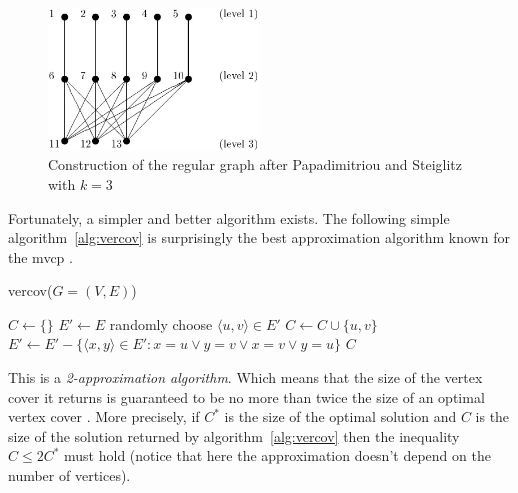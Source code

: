 \documentclass[12pt]{article}
\begin{document}
\begin{figure}[!htb]
\centering
\includegraphics[width=0.5\textwidth]{ps}
\caption[The regular graph after Papadimitriou
and Steiglitz for $k=3$]
{Construction of the regular graph after Papadimitriou
and Steiglitz with $k=3$}
\label{fig:ps}
\end{figure}

Fortunately, a simpler and better algorithm exists.
The following simple algorithm~\ref{alg:vercov} is surprisingly the
best approximation algorithm known for the mvcp \cite[p.~301]{9:mvcp}.

\begin{algorithm}[!htb]
\caption{vercov($G = (V, E)$)}
\label{alg:vercov}
\begin{algorithmic}[1]

\State $C \gets \{ \}$
\State $E' \gets E$
\State randomly choose $ \langle u, v \rangle \in E'$
\label{alg:rand}
\State $C \gets C \cup \{u, v\}$
\State $E' \gets E' -
\{ \langle x, y \rangle \in E' : x=u \vee y=v \vee x=v \vee y=u \}$
\State {}
\EndWhile
\State \Return $C$

\end{algorithmic}
\end{algorithm}

This is a \textit{2-approximation algorithm}. Which means that
the size of the vertex cover
it returns is guaranteed to be no more than twice the
size of an optimal vertex cover \cite[p.~968]{cormen}.
More precisely, if $C^*$ is the size of the optimal
solution and $C$ is the size of the solution returned by algorithm~\ref{alg:vercov}
then the inequality $C \leq 2C^*$ must hold (notice that here the approximation
doesn't depend on the number of vertices).
\end{document}
